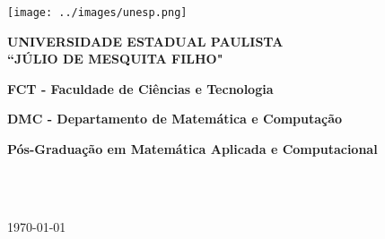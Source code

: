 \thispagestyle{empty}

\begin{minipage}[c]{0.3\textwidth}
\texttt{[image: ../images/unesp.png]}
\end{minipage}
\hspace{10pt}
\begin{minipage}[c]{0.6\textwidth}
\textbf{\uppercase{Universidade Estadual Paulista \\``Júlio de Mesquita Filho"}}
\end{minipage}

\begin{center}
    \noindent\hrulefill

    \textbf{FCT - Faculdade de Ciências e Tecnologia}

    \textbf{DMC - Departamento de Matemática e Computação}

    \textbf{Pós-Graduação em Matemática Aplicada e Computacional}
\end{center}

\vspace*{\fill}

\begin{center}
    \titulo\\
    \autor
\end{center}

\vspace{1cm}

\vspace*{\fill}

\begin{center}
    \uppercase{\cidade\\\today}
\end{center}